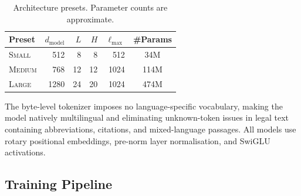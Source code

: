 \documentclass[11pt,a4paper]{article}
\begin{document}
\begin{table}[h]
\centering
\caption{Architecture presets. Parameter counts are approximate.}
\label{tab:presets}
\begin{tabular}{lrrrrc}
\toprule
Preset & $d_{\mathrm{model}}$ & $L$ & $H$ & $\ell_{\max}$ & \#Params \\
\midrule
\textsc{Small}  & 512  &  8 &  8 &  512 &  34M \\
\textsc{Medium} & 768  & 12 & 12 & 1024 & 114M \\
\textsc{Large}  & 1280 & 24 & 20 & 1024 & 474M \\
\bottomrule
\end{tabular}
\end{table}

The byte-level tokenizer imposes no language-specific vocabulary, making the
model natively multilingual and eliminating unknown-token issues in legal
text containing abbreviations, citations, and mixed-language passages. All
models use rotary positional embeddings, pre-norm layer normalisation,
and SwiGLU activations.

\subsection{Training Pipeline}
\end{document}
